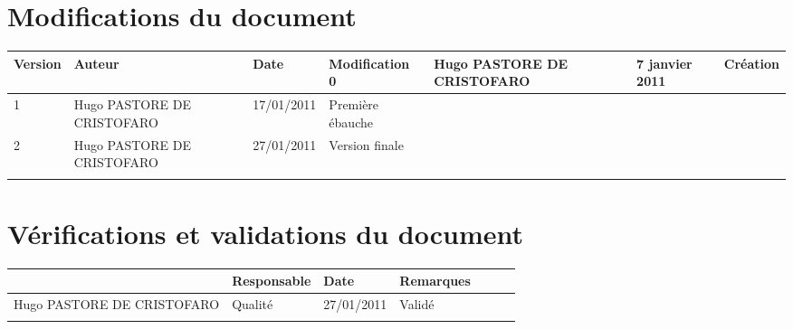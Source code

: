 
\section*{Modifications du document}

\begin{center}
\begin{longtable}{|m{14mm}||m{36mm}|m{36mm}|m{60mm}|}
\hline
Version & Auteur & Date & Modification\endhead \hline
0
& %
Hugo PASTORE DE CRISTOFARO
& %
7 janvier 2011
& %
Création
\\\hline
1
& %
Hugo PASTORE DE CRISTOFARO
& %
17/01/2011
& %
Première ébauche
\\\hline
2
& %
Hugo PASTORE DE CRISTOFARO
& %
27/01/2011
& %
Version finale
\\\hline

& %

& %

& %

\\\hline
\end{longtable}
\end{center}


\section*{Vérifications et validations du document}

\begin{center}
\begin{longtable}{|m{15mm}|m{36mm}|m{36mm}|m{60mm}|}
\hline
 & Responsable & Date & Remarques\endhead \hline

& %

& %

& %

\\\hline
Hugo PASTORE DE CRISTOFARO
& %
Qualité
& %
27/01/2011
& %
Validé
\\\hline

& %

& %

& %

\\\hline
\end{longtable}
\end{center}

\pagebreak
